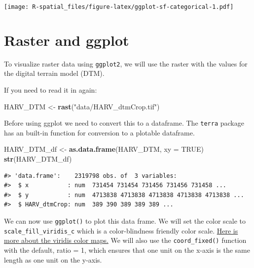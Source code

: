 \documentclass[
]{book}
\newenvironment{Shaded}{\begin{snugshade}}{\end{snugshade}}
\newcommand{\AttributeTok}[1]{\textcolor[rgb]{0.13,0.29,0.53}{#1}}
\newcommand{\ConstantTok}[1]{\textcolor[rgb]{0.56,0.35,0.01}{#1}}
\newcommand{\FunctionTok}[1]{\textcolor[rgb]{0.13,0.29,0.53}{\textbf{#1}}}
\newcommand{\NormalTok}[1]{#1}
\newcommand{\OtherTok}[1]{\textcolor[rgb]{0.56,0.35,0.01}{#1}}
\newcommand{\StringTok}[1]{\textcolor[rgb]{0.31,0.60,0.02}{#1}}
\begin{document}
\texttt{[image: R-spatial\_files/figure-latex/ggplot-sf-categorical-1.pdf]}

\hypertarget{raster-and-ggplot}{%
\section{Raster and ggplot}\label{raster-and-ggplot}}

To visualize raster data using \texttt{ggplot2}, we will use the raster with the values for the digital terrain model (DTM).

If you need to read it in again:

\begin{Shaded}
\begin{Highlighting}[]
\NormalTok{HARV\_DTM }\OtherTok{\textless{}{-}} \FunctionTok{rast}\NormalTok{(}\StringTok{"data/HARV\_dtmCrop.tif"}\NormalTok{)}
\end{Highlighting}
\end{Shaded}

Before using ggplot we need to convert this to a dataframe. The \texttt{terra} package has an built-in function for conversion to a plotable dataframe.

\begin{Shaded}
\begin{Highlighting}[]
\NormalTok{HARV\_DTM\_df }\OtherTok{\textless{}{-}} \FunctionTok{as.data.frame}\NormalTok{(HARV\_DTM, }\AttributeTok{xy =} \ConstantTok{TRUE}\NormalTok{)}
\FunctionTok{str}\NormalTok{(HARV\_DTM\_df)}
\end{Highlighting}
\end{Shaded}

\begin{verbatim}
#> 'data.frame':    2319798 obs. of  3 variables:
#>  $ x           : num  731454 731454 731456 731456 731458 ...
#>  $ y           : num  4713838 4713838 4713838 4713838 4713838 ...
#>  $ HARV_dtmCrop: num  389 390 389 389 389 ...
\end{verbatim}

We can now use \texttt{ggplot()} to plot this data frame. We will set the color scale to \texttt{scale\_fill\_viridis\_c} which is a color-blindness friendly color scale. \href{https://cran.r-project.org/web/packages/viridis/vignettes/intro-to-viridis.html}{Here is more about the viridis color maps.} We will also use the \texttt{coord\_fixed()} function with the default, ratio = 1, which ensures that one unit on the x-axis is the same length as one unit on the y-axis.
\end{document}
